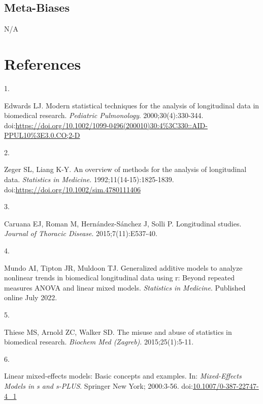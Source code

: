 \documentclass[
]{article}
\newlength{\cslhangindent}
\newlength{\csllabelwidth}
\newlength{\cslentryspacingunit} %
\newenvironment{CSLReferences}[2] %
 {%
  \setlength{\parindent}{0pt}
  \ifodd #1
  \let\oldpar\par
  \def\par{\hangindent=\cslhangindent\oldpar}
  \fi
  \setlength{\parskip}{#2\cslentryspacingunit}
 }%
 {}
\newcommand{\CSLLeftMargin}[1]{\parbox[t]{\csllabelwidth}{#1}}
\newcommand{\CSLRightInline}[1]{\parbox[t]{\linewidth - \csllabelwidth}{#1}\break}
\begin{document}
\hypertarget{meta-biases}{%
\subsection{Meta-Biases}\label{meta-biases}}

N/A

\hypertarget{references}{%
\section{References}\label{references}}

\hypertarget{refs}{}
\begin{CSLReferences}{0}{0}
\leavevmode{}%
\CSLLeftMargin{1. }%
\CSLRightInline{Edwards LJ. Modern statistical techniques for the
analysis of longitudinal data in biomedical research. \emph{Pediatric
Pulmonology}. 2000;30(4):330-344.
doi:\url{https://doi.org/10.1002/1099-0496(200010)30:4\%3C330::AID-PPUL10\%3E3.0.CO;2-D}}

\leavevmode{}%
\CSLLeftMargin{2. }%
\CSLRightInline{Zeger SL, Liang K-Y. An overview of methods for the
analysis of longitudinal data. \emph{Statistics in Medicine}.
1992;11(14-15):1825-1839.
doi:\url{https://doi.org/10.1002/sim.4780111406}}

\leavevmode{}%
\CSLLeftMargin{3. }%
\CSLRightInline{Caruana EJ, Roman M, Hernández-Sánchez J, Solli P.
Longitudinal studies. \emph{Journal of Thoracic Disease}.
2015;7(11):E537-40.}

\leavevmode{}%
\CSLLeftMargin{4. }%
\CSLRightInline{Mundo AI, Tipton JR, Muldoon TJ. Generalized additive
models to analyze nonlinear trends in biomedical longitudinal data using
r: Beyond repeated measures {ANOVA} and linear mixed models.
\emph{Statistics in Medicine}. Published online July 2022.}

\leavevmode{}%
\CSLLeftMargin{5. }%
\CSLRightInline{Thiese MS, Arnold ZC, Walker SD. The misuse and abuse of
statistics in biomedical research. \emph{Biochem Med (Zagreb)}.
2015;25(1):5-11.}

\leavevmode{}%
\CSLLeftMargin{6. }%
\CSLRightInline{Linear mixed-effects models: Basic concepts and
examples. In: \emph{Mixed-Effects Models in s and s-PLUS}. Springer New
York; 2000:3-56.
doi:\href{https://doi.org/10.1007/0-387-22747-4_1}{10.1007/0-387-22747-4\_1}}


\end{CSLReferences}
\end{document}
